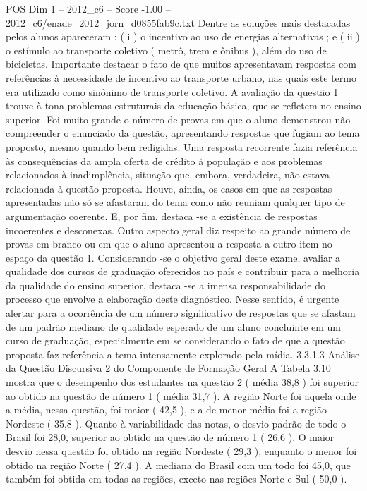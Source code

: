 \begin{textsample}{POS Dim 1 – 2012\_c6 – Score -1.00 – 2012\_c6/enade\_2012\_jorn\_d0855fab9c.txt}
Dentre as soluções mais destacadas pelos alunos apareceram : ( i ) o incentivo ao uso de energias alternativas ; e ( ii ) o estímulo ao transporte coletivo ( metrô, trem e ônibus ), além do uso de bicicletas.
Importante destacar o fato de que muitos apresentavam respostas com referências à necessidade de incentivo ao transporte urbano, nas quais este termo era utilizado como sinônimo de transporte coletivo.
A avaliação da questão 1 trouxe à tona problemas estruturais da educação básica, que se refletem no ensino superior.
Foi muito grande o número de provas em que o aluno demonstrou não compreender o enunciado da questão, apresentando respostas que fugiam ao tema proposto, mesmo quando bem redigidas.
Uma resposta recorrente fazia referência às consequências da ampla oferta de crédito à população e aos problemas relacionados à inadimplência, situação que, embora, verdadeira, não estava relacionada à questão proposta.
Houve, ainda, os casos em que as respostas apresentadas não só se afastaram do tema como não reuniam qualquer tipo de argumentação coerente.
E, por fim, destaca -se a existência de respostas incoerentes e desconexas.
Outro aspecto geral diz respeito ao grande número de provas em branco ou em que o aluno apresentou a resposta a outro item no espaço da questão 1.
Considerando -se o objetivo geral deste exame, avaliar a qualidade dos cursos de graduação oferecidos no país e contribuir para a melhoria da qualidade do ensino superior, destaca -se a imensa responsabilidade do processo que envolve a elaboração deste diagnóstico.
Nesse sentido, é urgente alertar para a ocorrência de um número significativo de respostas que se afastam de um padrão mediano de qualidade esperado de um aluno concluinte em um curso de graduação, especialmente em se considerando o fato de que a questão proposta faz referência a tema intensamente explorado pela mídia. 3.3.1.3 Análise da Questão Discursiva 2 do Componente de Formação Geral A Tabela 3.10 mostra que o desempenho dos estudantes na questão 2 ( média 38,8 ) foi superior ao obtido na questão de número 1 ( média 31,7 ).
A região Norte foi aquela onde a média, nessa questão, foi maior ( 42,5 ), e a de menor média foi a região Nordeste ( 35,8 ).
Quanto à variabilidade das notas, o desvio padrão de todo o Brasil foi 28,0, superior ao obtido na questão de número 1 ( 26,6 ).
O maior desvio nessa questão foi obtido na região Nordeste ( 29,3 ), enquanto o menor foi obtido na região Norte ( 27,4 ).
A mediana do Brasil com um todo foi 45,0, que também foi obtida em todas as regiões, exceto nas regiões Norte e Sul ( 50,0 ).

\end{textsample}
